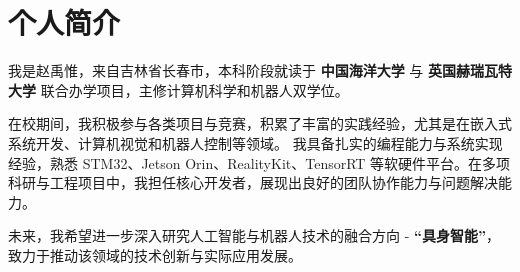 \documentclass{resume}
\begin{document}




\section{个人简介}\vspace{0.5em}
我是赵禹惟，来自吉林省长春市，本科阶段就读于 \textbf{中国海洋大学} 与 \textbf{英国赫瑞瓦特大学} 联合办学项目，主修计算机科学和机器人双学位。

在校期间，我积极参与各类项目与竞赛，积累了丰富的实践经验，尤其是在嵌入式系统开发、计算机视觉和机器人控制等领域。
我具备扎实的编程能力与系统实现经验，熟悉 STM32、Jetson Orin、RealityKit、TensorRT 等软硬件平台。在多项科研与工程项目中，我担任核心开发者，展现出良好的团队协作能力与问题解决能力。

未来，我希望进一步深入研究人工智能与机器人技术的融合方向 - \textbf{“具身智能”}，致力于推动该领域的技术创新与实际应用发展。

\vspace{0.8em}

\end{document}
